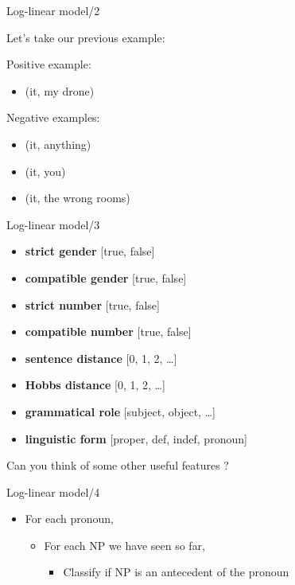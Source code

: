 \documentclass[dvipsnames, 10pt, compress]{beamer}
\begin{document}
\begin{frame}{Log-linear model/2} %

Let's take our previous example:

Positive example:
\begin{itemize}
 \item (it, my drone)
\end{itemize}

Negative examples:
\begin{itemize}
 \item (it, anything)
 \item (it, you)
 \item (it, the wrong rooms)
\end{itemize}




\end{frame}

\begin{frame}{Log-linear model/3} %

\begin{itemize}
  \item \textbf{strict gender} [true, false]
  \item \textbf{compatible gender} [true, false]
  \item \textbf{strict number} [true, false]
  \item \textbf{compatible number} [true, false]
  \item \textbf{sentence distance} [0, 1, 2, \ldots]
  \item \textbf{Hobbs distance} [0, 1, 2, \ldots] 
  \item \textbf{grammatical role} [subject, object, \ldots] 
  \item \textbf{linguistic form} [proper, def, indef, pronoun]
\end{itemize}

Can you think of some other useful features ? 

\end{frame}

\begin{frame}{Log-linear model/4} %

\begin{itemize}
  \item For each pronoun,
  \begin{itemize}
     \item For each NP we have seen so far,
     \begin{itemize}
       \item Classify if NP is an antecedent of the pronoun
     \end{itemize}
  \end{itemize}
\end{itemize}


\end{frame}
\end{document}
